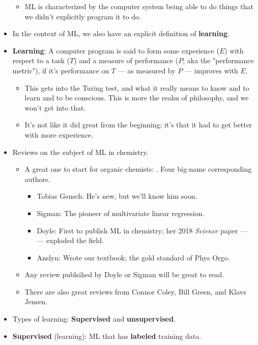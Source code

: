 \documentclass[../notes.tex]{subfiles}
\begin{document}
\begin{itemize}
    \begin{itemize}
        \item ML is characterized by the computer system being able to do things that we didn't explicitly program it to do.
    \end{itemize}
    \item In the context of ML, we also have an explicit definition of \textbf{learning}.
    \item \textbf{Learning}: A computer program is said to form some experience ($E$) with respect to a task ($T$) and a measure of performance ($P$; aka the "performance metric"), if it's performance on $T$ --- as measured by $P$ --- improves with $E$.
    \begin{itemize}
        \item This gets into the Turing test, and what it really means to know and to learn and to be conscious. This is more the realm of philosophy, and we won't get into that.
        \item It's not like it did great from the beginning; it's that it had to get better with more experience.
    \end{itemize}
    \item Reviews on the subject of ML in chemistry.
    \begin{itemize}
        \item A great one to start for organic chemists: \textcite{bib:MLChemRev}. Four big-name corresponding authors.
        \begin{itemize}
            \item Tobias Gensch: He's new, but we'll know him soon.
            \item Sigman: The pioneer of multivariate linear regression.
            \item Doyle: First to publish ML in chemistry; her 2018 \emph{Science} paper --- \textcite{bib:DoyleML} --- exploded the field.
            \item Anslyn: Wrote our textbook; the gold standard of Phys Orgo.
        \end{itemize}
        \item Any review publsihed by Doyle or Sigman will be great to read.
        \item There are also great reviews from Connor Coley, Bill Green, and Klavs Jensen.
    \end{itemize}
    \item Types of learning: \textbf{Supervised} and \textbf{unsupervised}.
    \item \textbf{Supervised} (learning): ML that has \textbf{labeled} training data.

\end{itemize}
\end{document}
